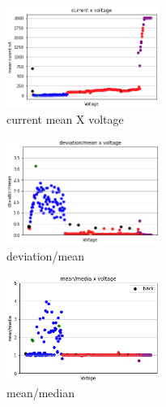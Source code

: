     \begin{multicols}{3}

        \begin{figure}[H]
            \center
            \includegraphics[width=5cm]{images/images_folder_3/data4_sjaakgraph1.png}
            \caption{current mean X voltage}
        \end{figure}

        \begin{figure}[H]
            \center
            \includegraphics[width=5cm]{images/images_folder_3/data4_sjaakgraph2.png}
            \caption{deviation/mean}
        \end{figure}

        \begin{figure}[H]
            \center
            \includegraphics[width=5cm]{images/images_folder_3/data4_sjaakgraph3.png}
            \caption{mean/median}
        \end{figure}

    \end{multicols}





